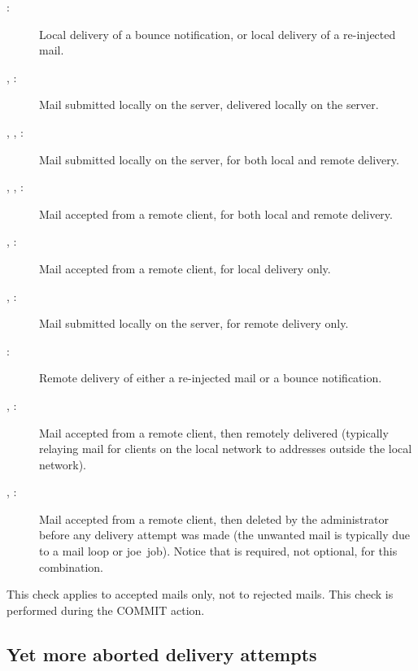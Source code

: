 \begin{description}

    \item [:] Local delivery of a bounce notification, or
        local delivery of a re-injected mail.

    \item [, :] Mail submitted locally on the
        server, delivered locally on the server.

    \item [, , :] Mail submitted
        locally \newline{} on the server, for both local and remote
        delivery.

    \item [, , :] Mail accepted
        from a remote client, for both local and remote delivery.

    \item [, :] Mail accepted from a remote
        client, for local delivery only.

    \item [, :] Mail submitted locally on the
        server, for remote delivery only.

    \item [:] Remote delivery of either a re-injected mail or
        a bounce notification.

    \item [, :] Mail accepted from a remote
        client, then remotely delivered (typically relaying mail for
        clients on the local network to addresses outside the local
        network).

    \item [, :] Mail accepted from a remote
        client, then deleted by the administrator before any delivery
        attempt was made (the unwanted mail is typically due to a mail loop
        or joe~job).  Notice that  is required, not
        optional, for this combination.

\end{description}

This check applies to accepted mails only, not to rejected mails.  This
check is performed during the COMMIT action.

\subsection{Yet more aborted delivery attempts}

